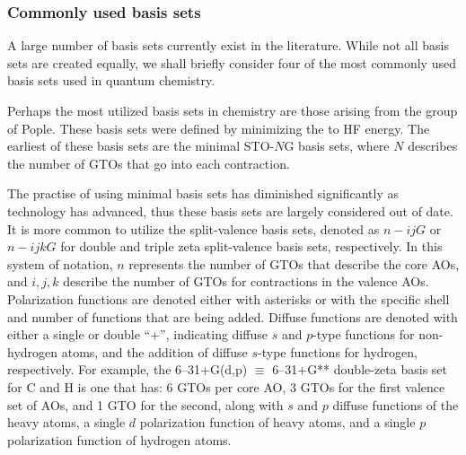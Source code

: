 \begin{doublespace}
\subsubsection{Commonly used basis sets}

A large number of basis sets currently exist in the
literature.\cite{Jensen2012} While not all basis sets are created equally, we
shall briefly consider four of the most commonly used basis sets used in
quantum chemistry.

\vspace{3mm}
\vspace{1mm}

Perhaps the most utilized basis sets in chemistry are those arising from the
group of Pople.\cite{Hehre1969, Ditchfield1971, Hehre1972} These basis sets were
defined by minimizing the  to HF energy. The earliest of these basis sets are
the minimal STO-$N$G basis sets, where $N$ describes the number of GTOs that go
into each contraction.

The practise of using minimal basis sets has diminished significantly as
technology has advanced, thus these basis sets are largely considered out of
date. It is more common to utilize the split-valence basis sets, denoted as
$n-ijG$ or $n-ijkG$ for double and triple zeta split-valence basis sets,
respectively. In this system of notation, $n$ represents the number of GTOs that
describe the core AOs, and $i, j, k$ describe the number of GTOs for
contractions in the valence AOs. Polarization functions are denoted either with
asterisks or with the specific shell and number of functions that are being
added. Diffuse functions are denoted with either a single or double ``+'',
indicating diffuse $s$ and $p$-type functions for non-hydrogen atoms, and the
addition of diffuse $s$-type functions for hydrogen, respectively. For example,
the 6--31+G(d,p) $\equiv$ 6--31+G** double-zeta basis set for C and H is one
that has: 6 GTOs per core AO, 3 GTOs for the first valence set of AOs, and 1 GTO
for the second, along with $s$ and $p$ diffuse functions of the heavy atoms, a
single $d$ polarization function of heavy atoms, and a single $p$ polarization
function of hydrogen atoms.

\vspace{3mm}
\vspace{1mm}


\end{doublespace}
